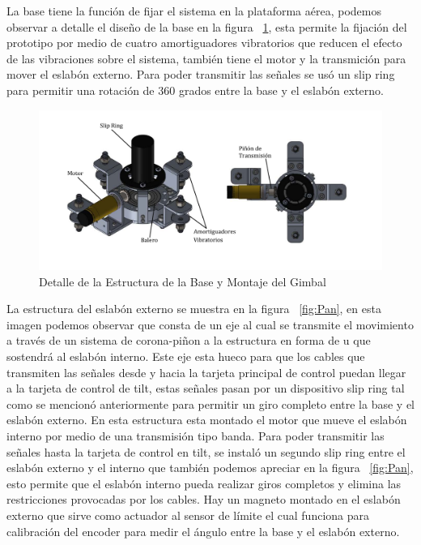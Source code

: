 La base tiene la funci\'{o}n de fijar el sistema en la plataforma a\'{e}rea, podemos observar a detalle el dise\~{n}o de la base en la figura ~\ref{fig:Base}, esta permite la fijaci\'{o}n del prototipo por medio de cuatro amortiguadores vibratorios que reducen el efecto de las vibraciones sobre el sistema, tambi\'{e}n tiene el motor y la transmici\'{o}n para mover el eslab\'{o}n externo. Para poder transmitir las se\~{n}ales se us\'{o} un slip ring para permitir una rotaci\'{o}n de 360 grados entre la base y el eslab\'{o}n externo.

\begin{figure}[H]
\centering \includegraphics[scale=0.55,trim = 30mm 20mm 30mm 5mm]{img/BaseGimbal.pdf}
\caption{Detalle de la Estructura de la Base y Montaje del Gimbal}
\label{fig:Base}
\end{figure}

La estructura del eslab\'{o}n externo se muestra en la figura ~\ref{fig:Pan}, en esta imagen podemos observar que consta de un eje al cual se transmite el movimiento a trav\'{e}s de un sistema de corona-pi\~{n}on a la estructura en forma de u que sostendr\'{a} al eslab\'{o}n interno. Este eje esta hueco para que los cables que transmiten las se\~{n}ales desde y hacia la tarjeta principal de control puedan llegar a la tarjeta de control de tilt, estas se\~{n}ales pasan por un dispositivo slip ring tal como se mencion\'{o} anteriormente para permitir un giro completo entre la base y el eslab\'{o}n externo. En esta estructura esta montado el motor que mueve el eslab\'{o}n interno por medio de una transmisi\'{o}n tipo banda. Para poder transmitir las se\~{n}ales hasta la tarjeta de control en tilt, se instal\'{o} un segundo slip ring entre el eslab\'{o}n externo y el interno que tambi\'{e}n podemos apreciar en la figura ~\ref{fig:Pan}, esto permite que el eslab\'{o}n interno pueda realizar giros completos y elimina las restricciones provocadas por los cables. Hay un magneto montado en el eslab\'{o}n externo que sirve como actuador al sensor de l\'{i}mite el cual funciona para calibraci\'{o}n del encoder para medir el \'{a}ngulo entre la base y el eslab\'{o}n externo. 


